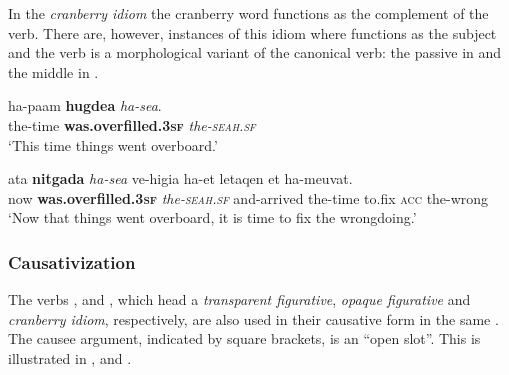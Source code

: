 \documentclass[output=paper]{langsci/langscibook}
\begin{document}

In the \textit{cranberry idiom}  the cranberry word  functions as the complement of the verb.  There are, however, instances of this idiom where  functions as the subject and the verb is a morphological variant of the canonical verb: the passive  in  and the middle  in .

    \ea\label{she:sea-passive}
         \gll ha-pa{\ayin}am \textbf{hugde{\shinB}a} \textit{ha-se{\alef}a}.\\
             the-time \textbf{was.overfilled.\textsc{3sf}} \textit{the-\textsc{seah}.\textsc{sf}}\\
         \glt `This time things went overboard.'
    \z

	\ea\label{she:sea-arg-rev}
    	\gll {\ayin}ata \textbf{nitgad{\shinB}a} \textit{ha-se{\alef}a} ve-higi{\ayin}a ha-{\ayin}et letaqen {\alef}et ha-me{\ayin}uvat.\\
    	   now \textbf{was.overfilled.\textsc{3sf}} \textit{the-\textsc{seah}.\textsc{sf}} and-arrived the-time to.fix \textsc{acc} the-wrong\\
    	\glt `Now that things went overboard, it is time to fix the wrongdoing.'
	\z

\subsubsection{Causativization}
\label{she:sec:causativization}

The verbs ,  and  , which head a \textit{transparent figurative}, \textit{opaque figurative} and \textit{cranberry idiom}, respectively, are also used in their causative form in the same . The causee argument, indicated by square brackets, is an ``open slot''. This is illustrated in ,  and .
\end{document}
